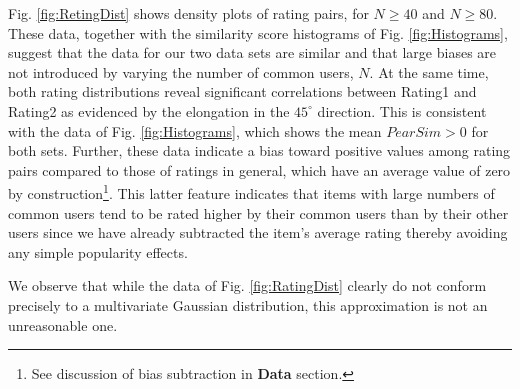 \documentclass[11pt]{article}
\begin{document}
Fig. \ref{fig:RetingDist} shows density plots of rating pairs, for $N \geq 40$
and $N \geq 80$. These data, together with the similarity score histograms of Fig.
\ref{fig:Histograms}, suggest that the data for our two data sets are similar
and that large biases are not introduced by varying the number of common users,
$N$. At the same time, both rating distributions reveal significant correlations
between Rating1 and Rating2 as evidenced by the elongation in the $45^\circ$
direction. This is consistent with the data of Fig. \ref{fig:Histograms}, which
shows the mean $PearSim > 0$ for both sets. Further, these data indicate a
bias toward positive values among rating pairs compared to those of ratings in
general, which have an average value of zero by construction\footnote{See
discussion of bias subtraction in {\bf Data} section.}. This latter feature
indicates that items with large numbers of common users tend to be rated higher
by their common users than by their other users since we have already subtracted
the item's average rating thereby avoiding any simple popularity effects.

We observe that while the data of Fig. \ref{fig:RatingDist} clearly do not
conform precisely to a multivariate Gaussian distribution, this approximation is
not an unreasonable one.
\end{document}
